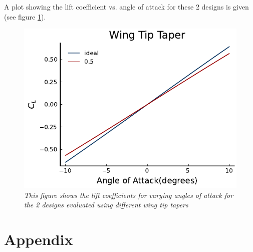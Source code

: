 \documentclass{journal}
\begin{document}
	A plot showing the lift coefficient vs. angle of attack for these 2 designs is given (see figure \ref{fig:taper}).
	
	\begin{figure}[H]
		\includegraphics{../graphics/taper.pdf}
		\caption{\emph{This figure shows the lift coefficients for varying angles of attack for the 2 designs evaluated using different wing tip tapers}}
		\label{fig:taper}
	\end{figure}
	\newpage
	
	\section{Appendix}
	
\end{document}
